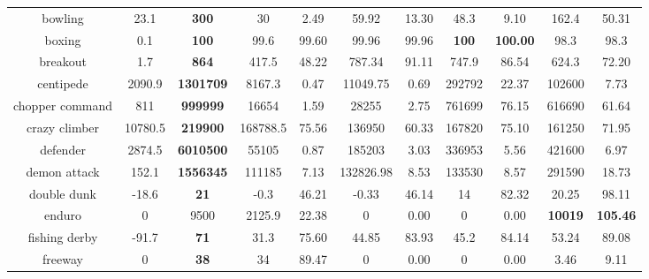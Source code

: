 \begin{center}
\begin{tabular}{ccccccccccc}
 bowling            & 23.1      & \textbf{300}       & 30       &2.49    & 59.92      & 13.30      & 48.3    & 9.10                                 & 162.4            & 50.31   \\
 boxing             & 0.1       & \textbf{100}                & 99.6     &99.60   & 99.96      & 99.96      & \textbf{100}     & \textbf{100.00}    & 98.3             & 98.3  \\
 breakout           & 1.7       & \textbf{864}                & 417.5    &48.22   & 787.34     & 91.11      & 747.9   & 86.54                       & 624.3             & 72.20  \\
 centipede          & 2090.9    & \textbf{1301709}   & 8167.3   &0.47    & 11049.75   & 0.69       & 292792  & 22.37                                & 102600           & 7.73 \\
 chopper command    & 811       & \textbf{999999}             & 16654    &1.59    & 28255      & 2.75       & 761699  & 76.15                       & 616690            & 61.64 \\
 crazy climber      & 10780.5   & \textbf{219900}    & 168788.5 &75.56   & 136950     & 60.33      & 167820  & 75.10                                         & 161250           & 71.95       \\
 defender           & 2874.5    & \textbf{6010500}   & 55105    &0.87    & 185203     & 3.03       & 336953  & 5.56                                 & 421600           & 6.97       \\
 demon attack       & 152.1     & \textbf{1556345}   & 111185   &7.13    & 132826.98  & 8.53       & 133530  & 8.57                                 & 291590           & 18.73       \\
 double dunk        & -18.6     & \textbf{21}                 & -0.3     &46.21   & -0.33      & 46.14      & 14      & 82.32                                & 20.25            & 98.11 \\
 enduro             & 0         & 9500               & 2125.9   &22.38   & 0          & 0.00       & 0       & 0.00                                 &\textbf{10019}             &\textbf{105.46}\\
 fishing derby      & -91.7     & \textbf{71}        & 31.3     &75.60   & 44.85      & 83.93      & 45.2    & 84.14                                & 53.24            & 89.08 \\
 freeway            & 0         & \textbf{38}        & 34       &89.47   & 0          & 0.00       & 0       & 0.00                                 & 3.46             & 9.11 \\

\end{tabular}
\end{center}
